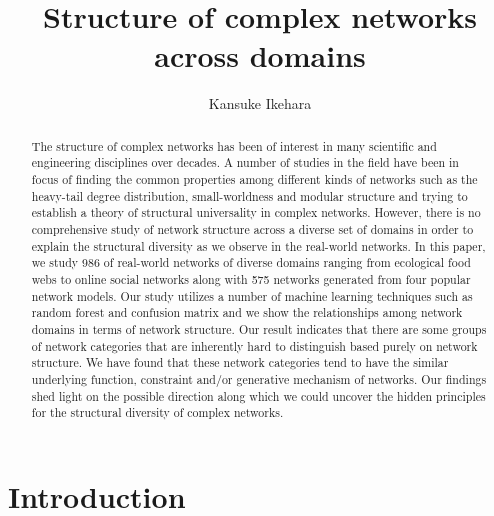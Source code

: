 \documentclass[..]{revtex4}
\begin{document}
\title{Structure of complex networks across domains}
\author{Kansuke Ikehara}


\begin{abstract}
The structure of complex networks has been of interest in many scientific and engineering disciplines over decades. A number of studies in the field have been in focus of finding the common properties among different kinds of networks such as the heavy-tail degree distribution, small-worldness and modular structure and trying to establish a theory of structural universality in complex networks. However, there is no comprehensive study of network structure across a diverse set of domains in order to explain the structural diversity as we observe in the real-world networks. In this paper, we study 986 of real-world networks of diverse domains ranging from ecological food webs to online social networks along with 575 networks generated from four popular network models. Our study utilizes a number of  machine learning techniques such as random forest and confusion matrix and we show the relationships among network domains in terms of network structure. Our result indicates that there are some groups of network categories that are inherently hard to distinguish based purely on network structure. We have found that these network categories tend to have the similar underlying function, constraint and/or generative mechanism of networks. Our findings shed light on the possible direction along which we could uncover the hidden principles for the structural diversity of complex networks.
  
\end{abstract}

\maketitle

\tableofcontents

\newpage
\section{Introduction}
\end{document}

